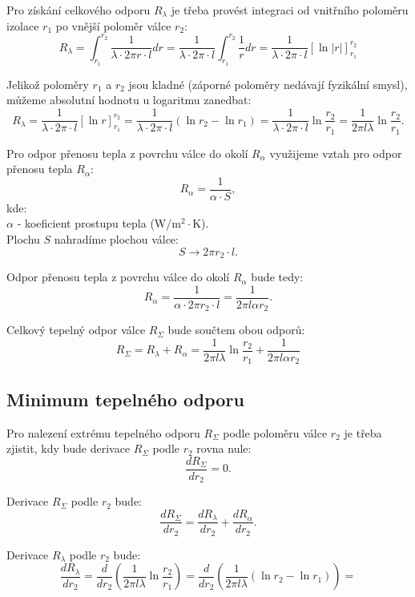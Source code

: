\documentclass{article}
\begin{document}
Pro získání celkového odporu $R_{\lambda}$ je třeba provést integraci od vnitřního poloměru izolace $r_1$ po vnější poloměr válce $r_2$:
$$
    R_{\lambda} = \int_{r_1}^{r_2} \frac{1}{\lambda \cdot 2 \pi r \cdot l} dr = \frac{1}{\lambda \cdot 2 \pi \cdot l} \int_{r_1}^{r_2} \frac{1}{r} dr = \frac{1}{\lambda \cdot 2 \pi \cdot l} \left[ \ln |r| \right]_{r_1}^{r_2}
$$

Jelikož poloměry $r_1$ a $r_2$ jsou kladné (záporné poloměry nedávají fyzikální smysl), můžeme absolutní hodnotu u logaritmu zanedbat:
$$
    R_{\lambda} = \frac{1}{\lambda \cdot 2 \pi \cdot l} \left[ \ln r \right]_{r_1}^{r_2} = \frac{1}{\lambda \cdot 2 \pi \cdot l} \left( \ln r_2 - \ln r_1 \right) = \frac{1}{\lambda \cdot 2 \pi \cdot l} \ln \frac{r_2}{r_1} = \frac{1}{2 \pi l \lambda} \ln \frac{r_2}{r_1}.
$$

Pro odpor přenosu tepla z povrchu válce do okolí $R_{\alpha}$ využijeme vztah pro odpor přenosu tepla $R_{\alpha}$:
$$
    R_{\alpha} = \frac{1}{\alpha \cdot S},
$$
kde:\\
$\alpha$ - koeficient prostupu tepla (W/m$^2 \cdot$K).\\

Plochu $S$ nahradíme plochou válce:
$$
    S \rightarrow 2 \pi r_2 \cdot l.
$$

Odpor přenosu tepla z povrchu válce do okolí $R_{\alpha}$ bude tedy:
$$
    R_{\alpha} = \frac{1}{\alpha \cdot 2 \pi r_2 \cdot l} = \frac{1}{2 \pi l \alpha r_2}.
$$

Celkový tepelný odpor válce $R_{\Sigma}$ bude součtem obou odporů:
$$
    R_{\Sigma} = R_{\lambda} + R_{\alpha} = \frac{1}{2 \pi l \lambda} \ln \frac{r_2}{r_1} + \frac{1}{2 \pi l \alpha r_2}
$$


\subsection{Minimum tepelného odporu}

Pro nalezení extrému tepelného odporu $R_{\Sigma}$ podle poloměru válce $r_2$ je třeba zjistit, kdy bude derivace $R_{\Sigma}$ podle $r_2$ rovna nule:
$$
    \frac{dR_{\Sigma}}{dr_2} = 0.
$$

Derivace $R_{\Sigma}$ podle $r_2$ bude:
$$
    \frac{dR_{\Sigma}}{dr_2} = \frac{dR_{\lambda}}{dr_2} + \frac{dR_{\alpha}}{dr_2}.
$$

Derivace $R_{\lambda}$ podle $r_2$ bude:
$$
    \frac{dR_{\lambda}}{dr_2} = \frac{d}{dr_2} \left( \frac{1}{2 \pi l \lambda} \ln \frac{r_2}{r_1} \right) = \frac{d}{dr_2} \left( \frac{1}{2 \pi l \lambda} \left(\ln r_2 - \ln r_1 \right) \right) =
$$
\end{document}

